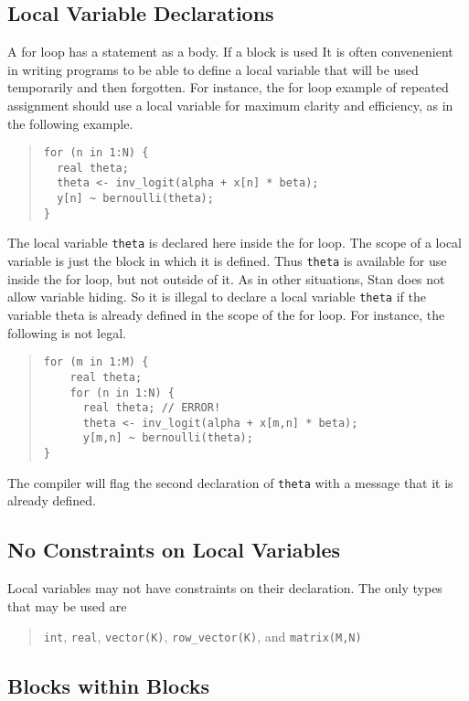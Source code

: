 \documentclass[10pt]{report}
\newcommand{\Stan}{Stan\xspace}
\newcommand{\code}[1]{{\tt #1}}
\begin{document}
\subsection{Local Variable Declarations}

A for loop has a statement as a body.  If a block is used 
It is often convenenient in writing programs to be able to define a
local variable that will be used temporarily and then forgotten.  
For instance, the for loop example of repeated assignment should
use a local variable for maximum clarity and efficiency, as in the
following example.
%
\begin{quote}
\begin{Verbatim}
for (n in 1:N) {
  real theta;
  theta <- inv_logit(alpha + x[n] * beta);
  y[n] ~ bernoulli(theta);
}
\end{Verbatim}
\end{quote}
%
The local variable \code{theta} is declared here inside the for loop.
The scope of a local variable is just the block in which it is
defined.  Thus \code{theta} is available for use inside the for loop,
but not outside of it.  As in other situations, \Stan does not allow
variable hiding.  So it is illegal to declare a local variable
\code{theta} if the variable theta is already defined in the scope of
the for loop.  For instance, the following is not legal.
%
\begin{quote}
\begin{Verbatim}
for (m in 1:M) {
    real theta;
    for (n in 1:N) {
      real theta; // ERROR!
      theta <- inv_logit(alpha + x[m,n] * beta);
      y[m,n] ~ bernoulli(theta);
}
\end{Verbatim}
\end{quote}
%
The compiler will flag the second declaration of \code{theta} with a
message that it is already defined.

\subsection{No Constraints on Local Variables}

Local variables may not have constraints on their declaration.  The
only types that may be used are
\begin{quote}
\code{int}, \code{real}, 
\code{vector(K)}, \code{row\_vector(K)}, and \code{matrix(M,N)}
\end{quote}

\subsection{Blocks within Blocks}
\end{document}
